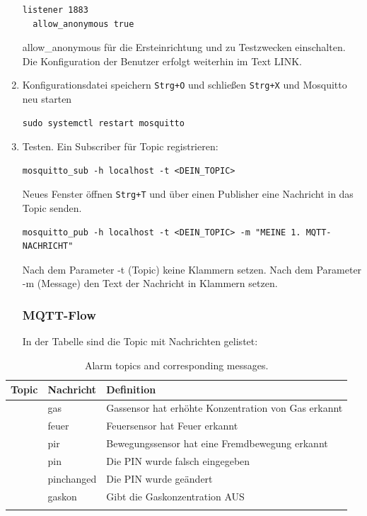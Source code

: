 \documentclass[12pt, letterpaper]{article}
\begin{document}
\begin{enumerate}
\begin{Verbatim}[frame=single]
  listener 1883
  allow_anonymous true
\end{Verbatim}
\par allow\_anonymous für die Ersteinrichtung und zu Testzwecken einschalten. Die Konfiguration der Benutzer erfolgt weiterhin im Text LINK.
\item Konfigurationsdatei speichern \texttt{Strg+O} und schließen \texttt{Strg+X} und Mosquitto neu starten 
\begin{Verbatim}[frame=single]
  sudo systemctl restart mosquitto
\end{Verbatim}
  \item Testen. Ein Subscriber für Topic registrieren: 
\begin{Verbatim}[frame=single]
  mosquitto_sub -h localhost -t <DEIN_TOPIC>
\end{Verbatim}
\par Neues Fenster öffnen \texttt{Strg+T} und über einen Publisher eine Nachricht in das Topic senden.
\begin{Verbatim}[frame=single]
  mosquitto_pub -h localhost -t <DEIN_TOPIC> -m "MEINE 1. MQTT-NACHRICHT"
\end{Verbatim}
\par Nach dem Parameter -t (Topic) keine Klammern setzen. Nach dem Parameter -m (Message) den Text der Nachricht in Klammern setzen.
\subsubsection{MQTT-Flow}
\par In der Tabelle sind die Topic mit Nachrichten gelistet:

\end{enumerate}
\begin{table}[h!]
  \centering
  \begin{tabular}{|>{\centering\arraybackslash}m{3cm}|>{\centering\arraybackslash}m{5cm}|>{\centering\arraybackslash}m{5cm}|}
  \hline
  \textbf{Topic} & \textbf{Nachricht} & \textbf{Definition} \\ \hline
  \multirow{4}{*}{alarm}  & gas        &  Gassensor hat erhöhte Konzentration von Gas erkannt\\ 
                          & feuer      &  Feuersensor hat Feuer erkannt\\  \hdashline 
                          & pir        &  Bewegungssensor hat eine Fremdbewegung erkannt\\  \cline{2-3} 
                          & pin        &  Die PIN wurde falsch eingegeben\\ \hline\cline{2-3}
  \multirow{3}{*}{status} & pinchanged &  Die PIN wurde geändert \\ 
                          & gaskon     & Gibt die Gaskonzentration AUS \\ \hline\cline{2-3} 
  \end{tabular}
  
  \caption{Alarm topics and corresponding messages.}
  \end{table}
\end{document}
